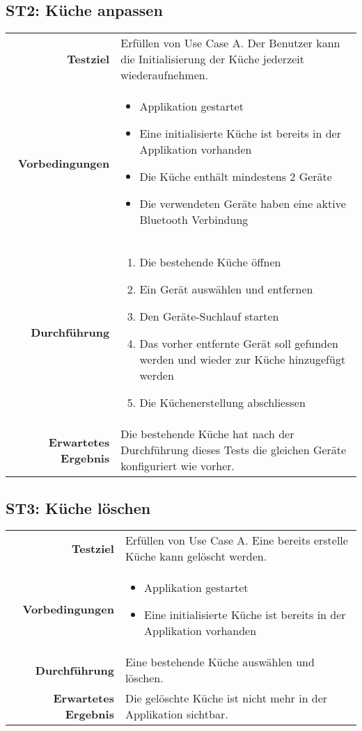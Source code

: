 \subsection{ST2: Küche anpassen}
\begin{table}[H]
\begin{tabularx}{\textwidth}{r X }
\textbf{Testziel} & Erfüllen von Use Case A. Der Benutzer kann die Initialisierung der Küche jederzeit wiederaufnehmen.\\
\textbf{Vorbedingungen} & \begin{itemize}
\item Applikation gestartet
\item Eine initialisierte Küche ist bereits in der Applikation vorhanden
\item Die Küche enthält mindestens 2 Geräte
\item Die verwendeten Geräte haben eine aktive Bluetooth Verbindung
\end{itemize} \\
\textbf{Durchführung} & \begin{enumerate}
\item Die bestehende Küche öffnen
\item Ein Gerät auswählen und entfernen
\item Den Geräte-Suchlauf starten
\item Das vorher entfernte Gerät soll gefunden werden und wieder zur Küche hinzugefügt werden
\item Die Küchenerstellung abschliessen
\end{enumerate} \\
\textbf{Erwartetes Ergebnis} & Die bestehende Küche hat nach der Durchführung dieses Tests die gleichen Geräte konfiguriert wie vorher.\\
\end{tabularx}
\end{table}

\subsection{ST3: Küche löschen}
\begin{table}[H]
\begin{tabularx}{\textwidth}{r X }
\textbf{Testziel} & Erfüllen von Use Case A. Eine bereits erstelle Küche kann gelöscht werden.\\
\textbf{Vorbedingungen} & \begin{itemize}
\item Applikation gestartet
\item Eine initialisierte Küche ist bereits in der Applikation vorhanden
\end{itemize} \\
\textbf{Durchführung} & Eine bestehende Küche auswählen und löschen. \\
\textbf{Erwartetes Ergebnis} & Die gelöschte Küche ist nicht mehr in der Applikation sichtbar.\\
\end{tabularx}
\end{table}

